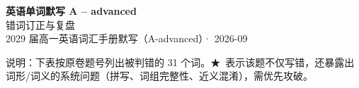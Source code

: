 \documentclass[11pt,a4paper]{article}
\newcommand{\STAR}{\textcolor{wrongred}{\starfont ★}}
\begin{document}
\begin{center}
{\LARGE\bfseries 英语单词默写 A -- advanced}\\[0.25em]
{\large 错词订正与复盘}\\[0.35em]
{\footnotesize 2029 届高一英语词汇手册默写（A-advanced）· 2026-09}
\end{center}

\vspace{-0.2em}
\noindent{\color{rulegray}\rule{\textwidth}{0.8pt}}

\vspace{0.7em}
\noindent{}

\vspace{0.8em}
\noindent 说明：下表按原卷题号列出被判错的 31 个词。\STAR\ 表示该题不仅写错，还暴露出词形/词义的系统问题（拼写、词组完整性、近义混淆），需优先攻破。
\end{document}
